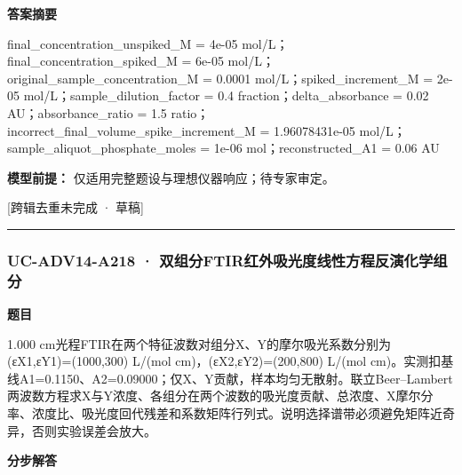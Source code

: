 \documentclass[UTF8,11pt,a4paper]{ctexart}
\begin{document}
\noindent\textbf{答案摘要}\par
final\_concentration\_unspiked\_M = 4e-05 mol/L；final\_concentration\_spiked\_M = 6e-05 mol/L；original\_sample\_concentration\_M = 0.0001 mol/L；spiked\_increment\_M = 2e-05 mol/L；sample\_dilution\_factor = 0.4 fraction；delta\_absorbance = 0.02 AU；absorbance\_ratio = 1.5 ratio；incorrect\_final\_volume\_spike\_increment\_M = 1.96078431e-05 mol/L；sample\_aliquot\_phosphate\_moles = 1e-06 mol；reconstructed\_A1 = 0.06 AU\par
\noindent\textbf{模型前提：}
仅适用完整题设与理想仪器响应；待专家审定。\par
\noindent\textcolor{red!65!black}{[跨辑去重未完成 · 草稿]} \par
\medskip\hrule\medskip
{}
\subsubsection*{UC-ADV14-A218 · 双组分FTIR红外吸光度线性方程反演化学组分}
\noindent\textbf{题目}\par
1.000 cm光程FTIR在两个特征波数对组分X、Y的摩尔吸光系数分别为(εX1,εY1)=(1000,300) L/(mol cm)，(εX2,εY2)=(200,800) L/(mol cm)。实测扣基线A1=0.1150、A2=0.09000；仅X、Y贡献，样本均匀无散射。联立Beer–Lambert两波数方程求X与Y浓度、各组分在两个波数的吸光度贡献、总浓度、X摩尔分率、浓度比、吸光度回代残差和系数矩阵行列式。说明选择谱带必须避免矩阵近奇异，否则实验误差会放大。\par
\medskip\noindent\textbf{分步解答}
\end{document}
